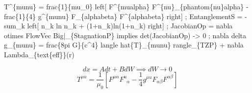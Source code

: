 
\begin{tzpsnapshot}
\end{tzpsnapshot}

T\textasciicircum{}\{munu\} = frac\{1\}\{mu\_0\} left[ F\textasciicircum{}\{mualpha\} F\textasciicircum{}\{nu\}\_\{phantom\{nu\}alpha\} - frac\{1\}\{4\} g\textasciicircum{}\{munu\} F\_\{alphabeta\} F\textasciicircum{}\{alphabeta\} right] ; EntanglementS = -sum\_k left[ n\_k ln n\_k + (1+n\_k)ln(1+n\_k) right] ; JacobianOp = nabla otimes FlowVec Big|\_\{StagnationP\} implies det(JacobianOp) -> 0 ; nabla delta g\_\{munu\} = frac\{8pi G\}\{c\textasciicircum{}4\} langle hat\{T\}\_\{munu\} rangle\_\{TZP\} + nabla Lambda\_\{text\{eff\}\}(r)

\[
dx = A dt + B dW \implies dW \to 0
\]
\[
T^{\mu u} = \frac{1}{\mu_0} \left[ F^{\mu\alpha} F^{ u}_{\phantom{ u}\alpha} - \frac{1}{4} g^{\mu u} F_{\alpha\beta} F^{\alpha\beta} \right]
\]


